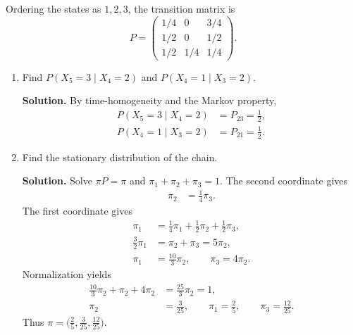 \documentclass[11pt]{article}
\begin{document}
\begin{enumerate}[label=\arabic*., leftmargin=1.6em]
\begin{center}
\end{center}
Ordering the states as \(1,2,3\), the transition matrix is
\[
P=
\begin{pmatrix}
1/4 & 0 & 3/4 \\
1/2 & 0 & 1/2 \\
1/2 & 1/4 & 1/4
\end{pmatrix}.
\]
\begin{enumerate}
\item Find $P(X_{5}=3\mid X_{4}=2)$ and $P(X_{4}=1\mid X_{3}=2)$.

\textbf{Solution.}
By time-homogeneity and the Markov property,
\begin{align*}
P(X_{5}=3\mid X_{4}=2)
&= P_{23}
= \frac{1}{2}, \\
P(X_{4}=1\mid X_{3}=2)
&= P_{21}
= \frac{1}{2}.
\end{align*}

\item Find the stationary distribution of the chain.

\textbf{Solution.}
Solve \(\pi P=\pi\) and \(\pi_{1}+\pi_{2}+\pi_{3}=1\). The second coordinate gives
\begin{align*}
\pi_{2}
&= \frac{1}{4}\pi_{3}.
\end{align*}
The first coordinate gives
\begin{align*}
\pi_{1}
&= \frac{1}{4}\pi_{1}+\frac{1}{2}\pi_{2}+\frac{1}{2}\pi_{3}, \\
\frac{3}{2}\pi_{1}
&= \pi_{2}+\pi_{3}
= 5\pi_{2}, \\
\pi_{1}
&= \frac{10}{3}\pi_{2},
\qquad
\pi_{3}
= 4\pi_{2}.
\end{align*}
Normalization yields
\begin{align*}
\frac{10}{3}\pi_{2}+\pi_{2}+4\pi_{2}
&= \frac{25}{3}\pi_{2}
= 1, \\
\pi_{2}
&= \frac{3}{25},
\qquad
\pi_{1}
= \frac{2}{5},
\qquad
\pi_{3}
= \frac{12}{25}.
\end{align*}
Thus \(\pi=\bigl(\tfrac{2}{5},\tfrac{3}{25},\tfrac{12}{25}\bigr)\).


\end{enumerate}
\end{enumerate}
\end{document}
